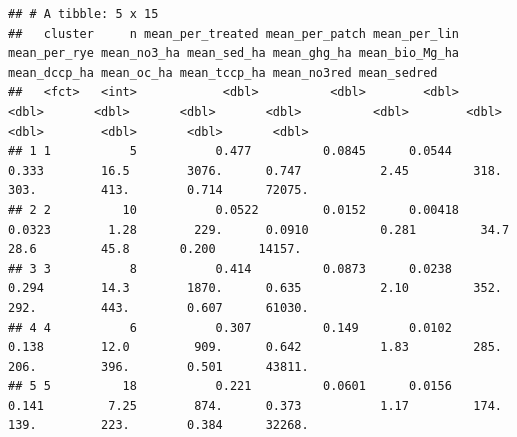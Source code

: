 \documentclass[
]{article}
\begin{document}
\begin{verbatim}
## # A tibble: 5 x 15
##   cluster     n mean_per_treated mean_per_patch mean_per_lin mean_per_rye mean_no3_ha mean_sed_ha mean_ghg_ha mean_bio_Mg_ha mean_dccp_ha mean_oc_ha mean_tccp_ha mean_no3red mean_sedred
##   <fct>   <int>            <dbl>          <dbl>        <dbl>        <dbl>       <dbl>       <dbl>       <dbl>          <dbl>        <dbl>      <dbl>        <dbl>       <dbl>       <dbl>
## 1 1           5           0.477          0.0845      0.0544        0.333        16.5        3076.      0.747           2.45         318.       303.         413.        0.714      72075.
## 2 2          10           0.0522         0.0152      0.00418       0.0323        1.28        229.      0.0910          0.281         34.7       28.6         45.8       0.200      14157.
## 3 3           8           0.414          0.0873      0.0238        0.294        14.3        1870.      0.635           2.10         352.       292.         443.        0.607      61030.
## 4 4           6           0.307          0.149       0.0102        0.138        12.0         909.      0.642           1.83         285.       206.         396.        0.501      43811.
## 5 5          18           0.221          0.0601      0.0156        0.141         7.25        874.      0.373           1.17         174.       139.         223.        0.384      32268.
\end{verbatim}
\end{document}
